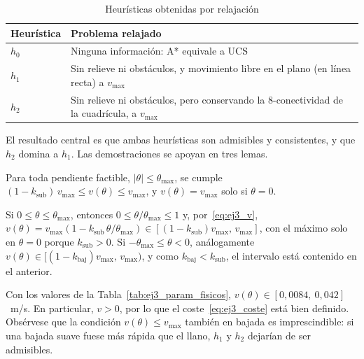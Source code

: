\begin{table}[t]
  \centering
  \caption{Heurísticas obtenidas por relajación}
  \label{tab:ej3_heuristicas}
  \footnotesize
  \begin{tabular}{@{}lp{5.2cm}@{}}
    \toprule
    Heurística & Problema relajado \\
    \midrule
    $h_0$ & Ninguna información: A* equivale a UCS \\
    $h_1$ & Sin relieve ni obstáculos, y movimiento libre en el plano
            (en línea recta) a $v_{\max}$ \\
    $h_2$ & Sin relieve ni obstáculos, pero conservando la
            8-conectividad de la cuadrícula, a $v_{\max}$ \\
    \bottomrule
  \end{tabular}
\end{table}

El resultado central es que ambas heurísticas son admisibles y consistentes,
y que $h_2$ domina a $h_1$. Las demostraciones se apoyan en tres lemas.

\begin{lema}
\label{lem:ej3_velocidad}
Para toda pendiente factible, $|\theta| \le \theta_{\max}$, se cumple
$(1 - k_{\mathrm{sub}})\,v_{\max} \le v(\theta) \le v_{\max}$, y
$v(\theta) = v_{\max}$ solo si $\theta = 0$.
\end{lema}
\begin{IEEEproof}
Si $0 \le \theta \le \theta_{\max}$, entonces
$0 \le \theta/\theta_{\max} \le 1$ y, por~\eqref{eq:ej3_v},
$v(\theta) = v_{\max}(1 - k_{\mathrm{sub}}\,\theta/\theta_{\max})
\in [(1 - k_{\mathrm{sub}})v_{\max},\, v_{\max}]$, con el máximo solo en
$\theta = 0$ porque $k_{\mathrm{sub}} > 0$. Si
$-\theta_{\max} \le \theta < 0$, análogamente
$v(\theta) \in [(1 - k_{\mathrm{baj}})v_{\max},\, v_{\max})$, y como
$k_{\mathrm{baj}} < k_{\mathrm{sub}}$, el intervalo está contenido en el
anterior.
\end{IEEEproof}

Con los valores de la Tabla~\ref{tab:ej3_param_fisicos},
$v(\theta) \in [0{,}0084,\ 0{,}042]$~m/s. En particular, $v > 0$, por lo que el
coste~\eqref{eq:ej3_coste} está bien definido. Obsérvese que la condición
$v(\theta) \le v_{\max}$ también en bajada es imprescindible: si una bajada suave
fuese más rápida que el llano, $h_1$ y $h_2$ dejarían de ser admisibles.

